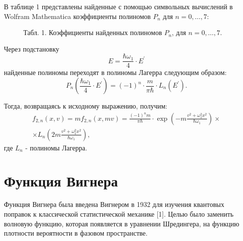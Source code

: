 \documentclass[a4paper,14pt]{article}
\begin{document}
В таблице 1 представлены найденные с помощью символьных вычислений в Wolfram Mathematica коэффициенты полиномов $P_n$ для $n=0,\ldots, 7$: 
\begin{figure}[H]
	\caption*{Табл. 1. Коэффициенты найденных полиномов $P_n$, для $n=0,\ldots, 7$.}
	\label{fig:image}
\end{figure}

Через подстановку
\begin{equation}
E=\frac{\hbar \omega_{1}}{4} \cdot E^{\prime}
\end{equation}
найденные полиномы переходят в полиномы Лагерра следующим образом:
\begin{equation}
P_{n}\left(\frac{\hbar \omega_{1}}{4} \cdot E^{\prime}\right)=(-1)^{n} \cdot \frac{m}{\pi \hbar} \cdot L_{n}\left(E^{\prime}\right).
\end{equation}

Тогда, возвращаясь к исходному выражению, получим:
\begin{eqnarray}
f_{2,n}(x, v)=m f_{2,n}(x, m v)=\frac{(-1)^{n} m}{\pi \hbar} \cdot \exp \left({-m \frac{v^{2}+\omega_1^{2} x^{2}}{\hbar \omega_{1}}}\right) \times \nonumber\\ \times L_{n}\left(2 m \frac{v^{2}+\omega_{1}^{2} x^{2}}{\hbar \omega_{1}}\right),
\end{eqnarray}
где $L_n$ - полиномы Лагерра.

\newpage
\section{Функция Вигнера}
Функция Вигнера была введена Вигнером в 1932 для изучения квантовых поправок к классической статистической механике [1]. Целью было заменить волновую функцию, которая появляется в уравнении Шредингера, на функцию плотности вероятности в фазовом пространстве.
\end{document}
